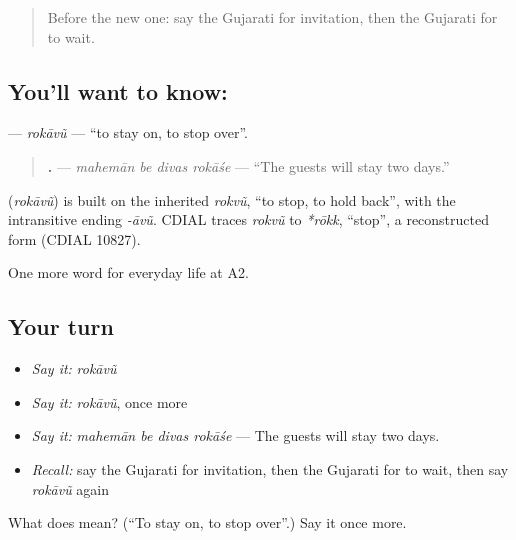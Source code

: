 \begin{quote}
Before the new one: say the Gujarati for invitation, then the Gujarati for to wait.
\end{quote}

\subsection*{You'll want to know: }
\textbf{} — \emph{rokāvũ} — \textquotedblleft{}to stay on, to stop over\textquotedblright{}.

\begin{quote}
\textbf{   .} — \emph{mahemān be divas rokāśe} — \textquotedblleft{}The guests will stay two days.\textquotedblright{}
\end{quote}

\begin{cousinweb}
\textbf{} (\emph{rokāvũ}) is built on the inherited \emph{rokvũ}, \textquotedblleft{}to stop, to hold back\textquotedblright{}, with the intransitive ending \emph{-āvũ}. CDIAL traces \emph{rokvũ} to \emph{*rōkk}, \textquotedblleft{}stop\textquotedblright{}, a reconstructed form (CDIAL 10827).
\end{cousinweb}

\begin{grammarlens}[title={What you've built}]
One more word for everyday life at A2.
\end{grammarlens}

\subsection*{Your turn}
\begin{itemize}
\raggedright
  \item \emph{Say it:} \emph{rokāvũ}
  \item \emph{Say it:} \emph{rokāvũ}, once more
  \item \emph{Say it:} \emph{mahemān be divas rokāśe} — The guests will stay two days.
  \item \emph{Recall:} say the Gujarati for invitation, then the Gujarati for to wait, then say \emph{rokāvũ} again
\end{itemize}

\begin{tcolorbox}[breakable,colback=teal!4,colframe=teal!35!black,title={Before you move on}]
What does  mean? (\textquotedblleft{}To stay on, to stop over\textquotedblright{}.) Say it once more.
\end{tcolorbox}

